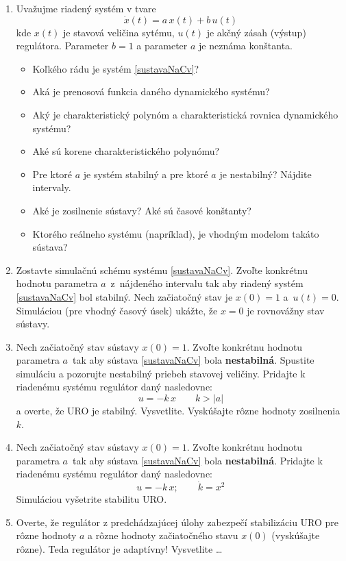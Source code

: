 \documentclass[a4paper, 10pt, ]{article}
\begin{document}
\begin{enumerate}[leftmargin=0pt, labelsep=3mm, itemsep=0pt]

	\item  Uvažujme riadený systém v tvare
	\begin{equation}
		\dot{x}(t) = a\, x(t) + b \, u(t) \label{sustavaNaCv}
	\end{equation}
	kde $x(t)$ je stavová veličina sytému, $u(t)$ je akčný zásah (výstup) regulátora. Parameter $b = 1$ a parameter $a$ je neznáma konštanta.
    \begin{itemize}
		\item Koľkého rádu je systém \eqref{sustavaNaCv}?
		\item Aká je prenosová funkcia daného dynamického systému?
		\item Aký je charakteristický polynóm a charakteristická rovnica dynamického systému?
		\item Aké sú korene charakteristického polynómu?
		\item Pre ktoré $a$ je systém stabilný a pre ktoré $a$ je nestabilný? Nájdite intervaly.
		\item Aké je zosilnenie sústavy? Aké sú časové konštanty?
		\item Ktorého reálneho systému (napríklad), je vhodným modelom takáto sústava?
	\end{itemize}

	\item Zostavte simulačnú schému systému \eqref{sustavaNaCv}. Zvoľte konkrétnu hodnotu parametra $a$~z~nájdeného intervalu tak aby riadený systém \eqref{sustavaNaCv} bol stabilný. Nech začiatočný stav je $x(0) = 1$ a~$u(t)=0$. Simuláciou (pre vhodný časový úsek) ukážte, že $x = 0$ je rovnovážny stav sústavy.

	\item Nech začiatočný stav sústavy $x(0) = 1$. Zvoľte konkrétnu hodnotu parametra $a$~tak aby sústava \eqref{sustavaNaCv} bola \textbf{nestabilná}. Spustite simuláciu a pozorujte nestabilný priebeh stavovej veličiny. Pridajte k riadenému systému regulátor daný nasledovne:
	\begin{equation}
		u = -k\, x \qquad k > \left| a \right|
	\end{equation}
	a overte, že URO je stabilný. Vysvetlite. Vyskúšajte rôzne hodnoty zosilnenia $k$.

	\item Nech začiatočný stav sústavy $x(0) = 1$. Zvoľte konkrétnu hodnotu parametra $a$~tak aby sústava \eqref{sustavaNaCv} bola \textbf{nestabilná}. Pridajte k riadenému systému regulátor daný nasledovne:
	\begin{equation}
		u = -k\, x; \qquad \dot{k} = x^2
	\end{equation}
	Simuláciou vyšetrite stabilitu URO.

	\item Overte, že regulátor z predchádzajúcej úlohy zabezpečí stabilizáciu URO pre rôzne hodnoty $a$ a rôzne hodnoty začiatočného stavu $x(0)$ (vyskúšajte rôzne). Teda regulátor je adaptívny! Vysvetlite \ldots

\end{enumerate}
\end{document}
